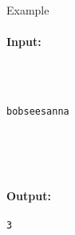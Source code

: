 Example
\paragraph{\textbf{    Input:   }}
\begin{verbatim}



bobseesanna





\end{verbatim}

\paragraph{   Output:  }
\begin{verbatim}
3\end{verbatim}